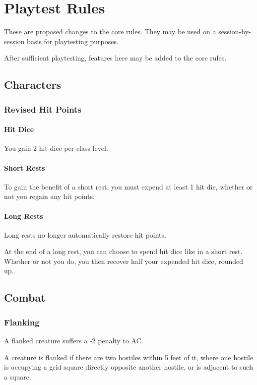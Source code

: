 \documentclass[House_Rules.tex]{subfiles}
\begin{document}
\chapter{Playtest Rules}
These are proposed changes to the core rules. They may be used on a session-by-session basis for playtesting purposes. 

After sufficient playtesting, features here may be added to the core rules.

\section{Characters}

\subsection{Revised Hit Points}

\subsubsection{Hit Dice}
You gain 2 hit dice per class level. 

\subsubsection{Short Rests}
To gain the benefit of a short rest, you must expend at least 1 hit die, whether or not you regain any hit points.

\subsubsection{Long Rests}
Long rests no longer automatically restore hit points.

At the end of a long rest, you can choose to spend hit dice like in a short rest. Whether or not you do, you then recover half your expended hit dice, rounded up.

\section{Combat}

\subsection{Flanking}
A flanked creature suffers a -2 penalty to AC.

A creature is flanked if there are two hostiles within 5 feet of it, where one hostile is occupying a grid square directly opposite another hostile, or is adjacent to such a square.
\end{document}

